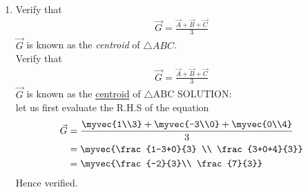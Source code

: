 \documentclass[11pt]{book}
\begin{document}
\begin{enumerate}[label=\thesection.\arabic*.,ref=\thesection.\theenumi]
\item Verify that 
		\begin{align}
			\vec{G}=\frac{\vec{A}+\vec{B}+\vec{C}}{3}
		\end{align}
$\vec{G}$ is known as the {\em centroid} of $\triangle ABC$.\\
Verify that\\
\begin{align}
 \vec{G}=\frac{\vec{A}+\vec{B}+\vec{C}}{3}   
\end{align}
$\vec{G}$ is known as the \underline{centroid} of $\triangle$ABC 
SOLUTION:\\
let us first evaluate the R.H.S of the equation
\begin{equation}
\begin{split}
\label{eq:centroid}
    \vec{G}&= \frac{\myvec{1\\3}+\myvec{-3\\0}+\myvec{0\\4}}{3}\\    
    &= \myvec{\frac{1-3+0}{3} \\ \frac{3+0+4}{3}}\\
     &= \myvec{\frac{-2}{3}\\ \frac{7}{3}}
\end{split}
\end{equation}
Hence verified.



\end{enumerate}
\end{document}

